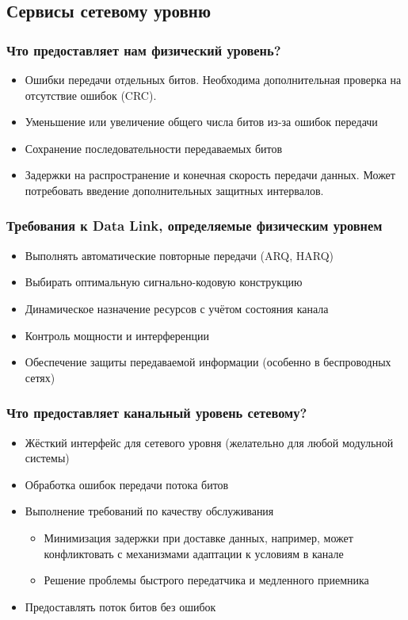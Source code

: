 \documentclass[utf8]{beamer}
\begin{document}
\subsection{Сервисы сетевому уровню}
\begin{frame}
\frametitle{Что предоставляет нам физический уровень?}
\begin{itemize}
	\item Ошибки передачи отдельных битов. Необходима дополнительная проверка на отсутствие ошибок (CRC).
	\item Уменьшение или увеличение общего числа битов из-за ошибок передачи
	\item Сохранение последовательности передаваемых битов
	\item Задержки на распространение и конечная скорость передачи данных. Может потребовать введение дополнительных защитных интервалов.
\end{itemize}
\end{frame}
\begin{frame}
\frametitle{Требования к Data Link, определяемые физическим уровнем}
\begin{itemize}
	\item Выполнять автоматические повторные передачи (ARQ, HARQ)
	\item Выбирать оптимальную сигнально-кодовую конструкцию
	\item Динамическое назначение ресурсов с учётом состояния канала
	\item Контроль мощности и интерференции
	\item Обеспечение защиты передаваемой информации (особенно в беспроводных сетях)
\end{itemize}
\end{frame}
\begin{frame}
\frametitle{Что предоставляет канальный уровень сетевому?}
\begin{itemize}
	\item Жёсткий интерфейс для сетевого уровня (желательно для любой модульной системы)
	\item Обработка ошибок передачи потока битов
	\item Выполнение требований по качеству обслуживания
	\begin{itemize}
		\item Минимизация задержки при доставке данных, например, может конфликтовать с механизмами адаптации к условиям в канале
		\item Решение проблемы быстрого передатчика и медленного приемника
	\end{itemize}
	\item Предоставлять поток битов без ошибок
\end{itemize}
\end{frame}
\end{document}
